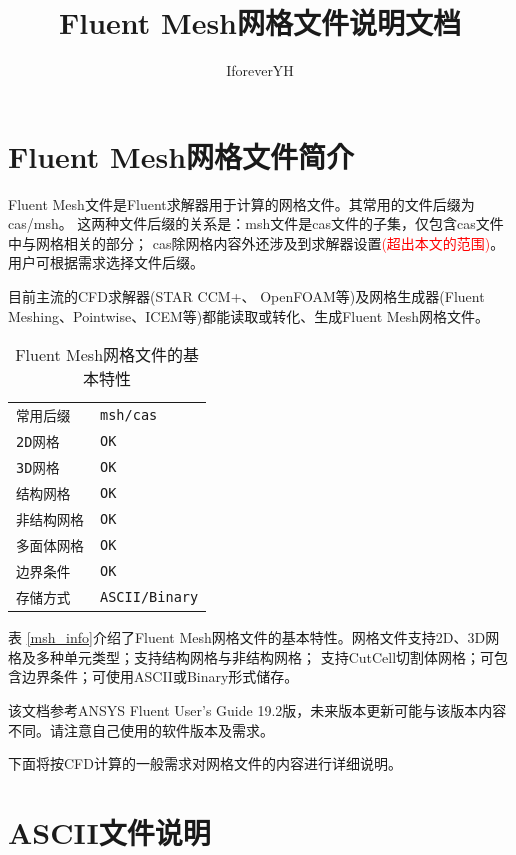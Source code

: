 \documentclass[lang=cn,11pt,a4paper]{elegantpaper} %
\title{Fluent Mesh网格文件说明文档}
\author{IforeverYH}
\date{\zhtoday}
\begin{document}
\maketitle

\section{Fluent Mesh网格文件简介}

Fluent Mesh文件是Fluent求解器用于计算的网格文件。其常用的文件后缀为cas/msh。
这两种文件后缀的关系是：msh文件是cas文件的子集，仅包含cas文件中与网格相关的部分；
cas除网格内容外还涉及到求解器设置\textcolor{red}{(超出本文的范围)}。用户可根据需求选择文件后缀。

目前主流的CFD求解器(STAR CCM+、 OpenFOAM等)及网格生成器(Fluent Meshing、Pointwise、ICEM等)都能读取或转化、生成Fluent Mesh网格文件。

\label{msh_info}
\begin{table}[!htb]
  \centering
  \caption{Fluent Mesh网格文件的基本特性}
  \begin{tabular}{*{2}{l}}
   \hline
   \texttt{常用后缀}         & \texttt{msh/cas} \\
   \texttt{2D网格}           & \texttt{OK} \\
   \texttt{3D网格}           & \texttt{OK} \\
   \texttt{结构网格}         & \texttt{OK} \\
   \texttt{非结构网格}       & \texttt{OK} \\
   \texttt{多面体网格}       & \texttt{OK} \\
   \texttt{边界条件}         & \texttt{OK} \\
   \texttt{存储方式}         & \texttt{ASCII/Binary} \\
   \hline
  \end{tabular}
\end{table}

表 \ref{msh_info}介绍了Fluent Mesh网格文件的基本特性。网格文件支持2D、3D网格及多种单元类型；支持结构网格与非结构网格；
支持CutCell切割体网格；可包含边界条件；可使用ASCII或Binary形式储存。

该文档参考ANSYS Fluent User's Guide 19.2版，未来版本更新可能与该版本内容不同。请注意自己使用的软件版本及需求。

下面将按CFD计算的一般需求对网格文件的内容进行详细说明。


\section{ASCII文件说明}
\end{document}
